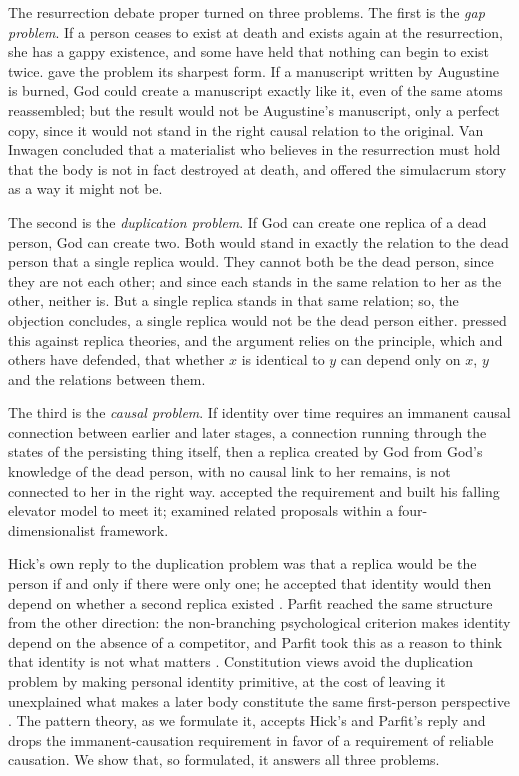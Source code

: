 \documentclass{situationist-preprint}
\begin{document}
The resurrection debate proper turned on three problems. The first is the \emph{gap problem}. If a person ceases to exist at death and exists again at the resurrection, she has a gappy existence, and some have held that nothing can begin to exist twice. \citet{vanInwagen1978} gave the problem its sharpest form. If a manuscript written by Augustine is burned, God could create a manuscript exactly like it, even of the same atoms reassembled; but the result would not be Augustine's manuscript, only a perfect copy, since it would not stand in the right causal relation to the original. Van Inwagen concluded that a materialist who believes in the resurrection must hold that the body is not in fact destroyed at death, and offered the simulacrum story as a way it might not be.

The second is the \emph{duplication problem}. If God can create one replica of a dead person, God can create two. Both would stand in exactly the relation to the dead person that a single replica would. They cannot both be the dead person, since they are not each other; and since each stands in the same relation to her as the other, neither is. But a single replica stands in that same relation; so, the objection concludes, a single replica would not be the dead person either. \citet{Penelhum1970} pressed this against replica theories, and the argument relies on the principle, which \citet{Wiggins1980} and others have defended, that whether $x$ is identical to $y$ can depend only on $x$, $y$ and the relations between them.

The third is the \emph{causal problem}. If identity over time requires an immanent causal connection between earlier and later stages, a connection running through the states of the persisting thing itself, then a replica created by God from God's knowledge of the dead person, with no causal link to her remains, is not connected to her in the right way. \citet{Zimmerman1999} accepted the requirement and built his falling elevator model to meet it; \citet{Hudson2001} examined related proposals within a four-dimensionalist framework.

Hick's own reply to the duplication problem was that a replica would be the person if and only if there were only one; he accepted that identity would then depend on whether a second replica existed \citep{Hick1976}. Parfit reached the same structure from the other direction: the non-branching psychological criterion makes identity depend on the absence of a competitor, and Parfit took this as a reason to think that identity is not what matters \citep[ch.~12]{Parfit1984}. Constitution views avoid the duplication problem by making personal identity primitive, at the cost of leaving it unexplained what makes a later body constitute the same first-person perspective \citep{Baker2000}. The pattern theory, as we formulate it, accepts Hick's and Parfit's reply and drops the immanent-causation requirement in favor of a requirement of reliable causation. We show that, so formulated, it answers all three problems.
\end{document}
